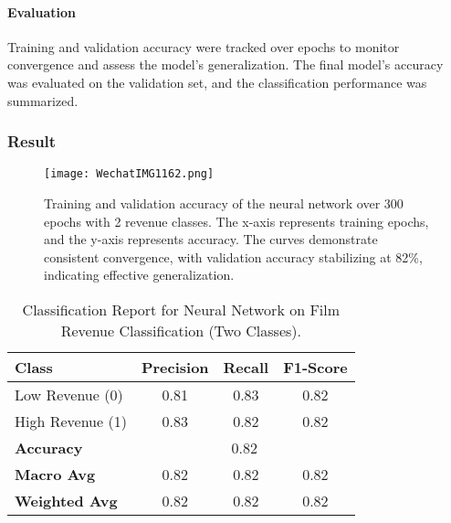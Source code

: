 \documentclass{article}
\begin{document}
\paragraph{Evaluation}
Training and validation accuracy were tracked over epochs to monitor convergence and assess the model’s generalization. The final model’s accuracy was evaluated on the validation set, and the classification performance was summarized.

\subsubsection{Result}
\begin{figure}[H] 
    \centering
    \vspace{0.3cm} 
    \texttt{[image: WechatIMG1162.png]} 
    \caption{Training and validation accuracy of the neural network over 300 epochs with 2 revenue classes. The x-axis represents training epochs, and the y-axis represents accuracy. The curves demonstrate consistent convergence, with validation accuracy stabilizing at 82\%, indicating effective generalization.}
    \label{fig:training_validation_accuracy}
\end{figure}

\begin{table}[H]
    \centering
    \small %
    \caption{Classification Report for Neural Network on Film Revenue Classification (Two Classes).}
    \label{tab:classification_report}
    \vspace{0.1in} %
    \begin{tabular}{lccc}
        \toprule
        \textbf{Class} & \textbf{Precision} & \textbf{Recall} & \textbf{F1-Score} \\
        \midrule
        Low Revenue (0)  & 0.81 & 0.83 & 0.82 \\
        High Revenue (1) & 0.83 & 0.82 & 0.82 \\
        \midrule
        \textbf{Accuracy}  & \multicolumn{3}{c}{0.82} \\
        \textbf{Macro Avg} & 0.82 & 0.82 & 0.82 \\
        \textbf{Weighted Avg} & 0.82 & 0.82 & 0.82 \\
        \bottomrule
    \end{tabular}
    \vspace{0.1in} %
\end{table}
\end{document}
